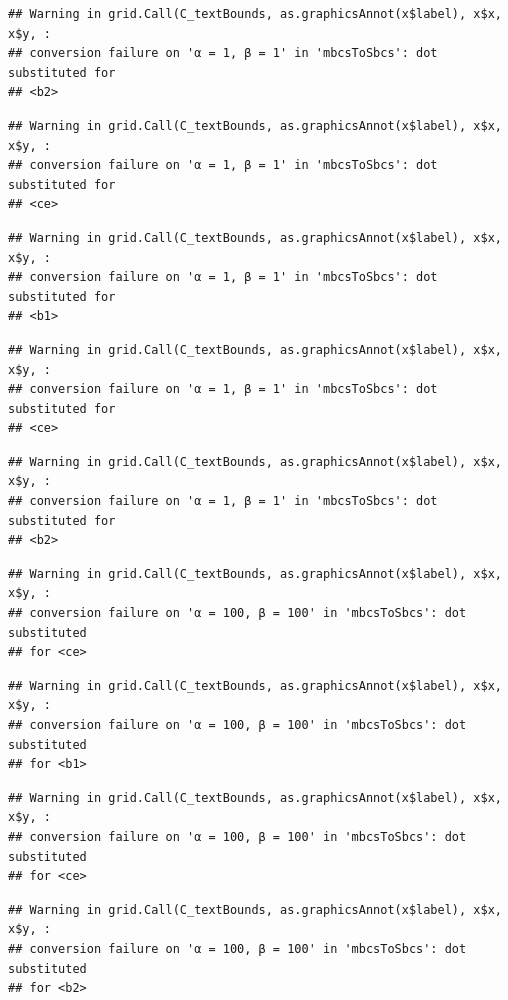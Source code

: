 \documentclass[]{book}
\theoremstyle{definition}
\theoremstyle{definition}
\theoremstyle{definition}
\theoremstyle{remark}
\begin{document}
\begin{verbatim}
## Warning in grid.Call(C_textBounds, as.graphicsAnnot(x$label), x$x, x$y, :
## conversion failure on 'α = 1, β = 1' in 'mbcsToSbcs': dot substituted for
## <b2>
\end{verbatim}

\begin{verbatim}
## Warning in grid.Call(C_textBounds, as.graphicsAnnot(x$label), x$x, x$y, :
## conversion failure on 'α = 1, β = 1' in 'mbcsToSbcs': dot substituted for
## <ce>
\end{verbatim}

\begin{verbatim}
## Warning in grid.Call(C_textBounds, as.graphicsAnnot(x$label), x$x, x$y, :
## conversion failure on 'α = 1, β = 1' in 'mbcsToSbcs': dot substituted for
## <b1>
\end{verbatim}

\begin{verbatim}
## Warning in grid.Call(C_textBounds, as.graphicsAnnot(x$label), x$x, x$y, :
## conversion failure on 'α = 1, β = 1' in 'mbcsToSbcs': dot substituted for
## <ce>
\end{verbatim}

\begin{verbatim}
## Warning in grid.Call(C_textBounds, as.graphicsAnnot(x$label), x$x, x$y, :
## conversion failure on 'α = 1, β = 1' in 'mbcsToSbcs': dot substituted for
## <b2>
\end{verbatim}

\begin{verbatim}
## Warning in grid.Call(C_textBounds, as.graphicsAnnot(x$label), x$x, x$y, :
## conversion failure on 'α = 100, β = 100' in 'mbcsToSbcs': dot substituted
## for <ce>
\end{verbatim}

\begin{verbatim}
## Warning in grid.Call(C_textBounds, as.graphicsAnnot(x$label), x$x, x$y, :
## conversion failure on 'α = 100, β = 100' in 'mbcsToSbcs': dot substituted
## for <b1>
\end{verbatim}

\begin{verbatim}
## Warning in grid.Call(C_textBounds, as.graphicsAnnot(x$label), x$x, x$y, :
## conversion failure on 'α = 100, β = 100' in 'mbcsToSbcs': dot substituted
## for <ce>
\end{verbatim}

\begin{verbatim}
## Warning in grid.Call(C_textBounds, as.graphicsAnnot(x$label), x$x, x$y, :
## conversion failure on 'α = 100, β = 100' in 'mbcsToSbcs': dot substituted
## for <b2>
\end{verbatim}
\end{document}
